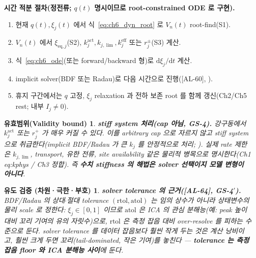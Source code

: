 \documentclass[11pt,a4paper]{article}
\newtheorem*{boundbox}{유효범위(Validity bound)}
\newtheorem*{verifybox}{유도 검증 (차원·극한·부호)}
\newcommand{\dd}{\mathrm{d}}
\newcommand{\eff}{\mathrm{eff}}
\newcommand{\eq}{\mathrm{eq}}
\newcommand{\AL}[1]{\textsf{[AL-#1]}}
\begin{document}
\textbf{시간 적분 절차(정전류; $q(t)$ 명시이므로 root-constrained ODE 로 구현).}
\begin{enumerate}[label=T\arabic*),leftmargin=2.4em]
\item 현재 $q(t),\xi_j(t)$ 에서 식~\eqref{eq:ch6_dyn_root} 로 $V_n(t)$ root-find(S1).
\item $V_n(t)$ 에서 $\xi_{\eq,j}$(S2), $k_j^{\mathrm{act}},k_{j,\lim},k_j^{\eff}$ 또는 $r_j^\pm$(S3) 계산.
\item 식~\eqref{eq:ch6_ode}(또는 forward/backward 형)로 $\dd\xi_j/\dd t$ 계산.
\item implicit solver(BDF 또는 Radau)로 다음 시간으로 진행(\AL{60}, \cite{hindmarsh2005}).
\item 휴지 구간에서는 $q$ 고정, $\xi_j$ relaxation 과 전하 보존 root 를 함께 갱신(Ch2/Ch5 rest; 내부 $I_j\ne0$).
\end{enumerate}
\begin{boundbox}
\textbf{stiff system 처리(cap 아님, GS-4).} 강구동에서 $k_j^{\mathrm{act}}$ 또는 $r_j^+$ 가 매우 커질 수 있다.
이를 arbitrary cap 으로 자르지 않고 \emph{stiff system} 으로 취급한다(implicit BDF/Radau 가 큰 $k_j$ 를 안정적으로
처리; \cite{brenan1996,hindmarsh2005}). 실제 rate 제한은 $k_{j,\lim}$, transport, 유한 전류, site availability
같은 물리적 병목으로 명시한다(Ch1 eq:kphys / Ch3 정합). 즉 \textbf{수치 stiffness 의 해법은 solver 선택이지
모델 변형이 아니다}.
\end{boundbox}
\begin{verifybox}
\textbf{solver tolerance 의 근거(\AL{64}, GS-4$'$).} BDF/Radau 의 상대$\cdot$절대 tolerance $(\mathrm{rtol},
\mathrm{atol})$ 는 임의 상수가 아니라 상태변수의 물리 scale 로 정한다: $\xi_j\in[0,1]$ 이므로 $\mathrm{atol}$ 은
ICA 의 관심 분해능(예: peak 높이 대비 꼬리 기여의 유의 자릿수)으로, $\mathrm{rtol}$ 은 측정 잡음 대비 over-resolve
를 피하는 수준으로 둔다. solver tolerance 를 데이터 잡음보다 훨씬 작게 두는 것은 계산 낭비이고, 훨씬 크게 두면
꼬리(tail-dominated, 작은 기여)를 놓친다 — \textbf{tolerance 는 측정 잡음 floor 와 ICA 분해능 사이}에 둔다.
\end{verifybox}

\end{document}
